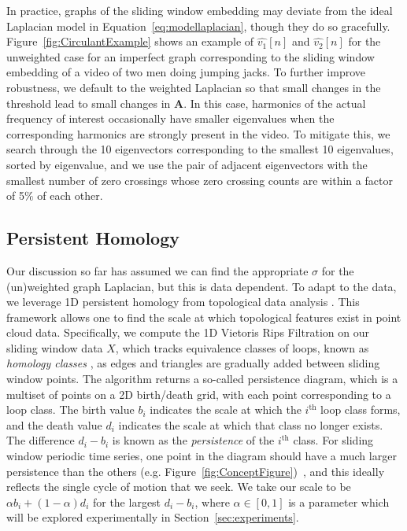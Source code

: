 \documentclass{article}
\newcommand{\mb}{\mathbf}
\begin{document}
In practice, graphs of the sliding window embedding may deviate from the ideal Laplacian model in Equation~\ref{eq:modellaplacian}, though they do so gracefully.  Figure~\ref{fig:CirculantExample} shows an example of $\hat{v_1}[n]$ and $\hat{v_2}[n]$ for the unweighted case for an imperfect graph corresponding to the sliding window embedding of a video of two men doing jumping jacks.  To further improve robustness, we default to the weighted Laplacian so that small changes in the threshold lead to small changes in $\mb{A}$.  In this case, harmonics of the actual frequency of interest occasionally have smaller eigenvalues when the corresponding harmonics are strongly present in the video.  To mitigate this, we search through the 10 eigenvectors corresponding to the smallest 10 eigenvalues, sorted by eigenvalue, and we use the pair of adjacent eigenvectors with the smallest number of zero crossings whose zero crossing counts are within a factor of 5$\%$ of each other.

\subsection{Persistent Homology}
\label{sec:tda}
Our discussion so far has assumed we can find the appropriate $\sigma$ for the (un)weighted graph Laplacian, but this is data dependent.
To adapt to the data, we leverage 1D persistent homology from topological data analysis \cite{edelsbrunner2010computational}.  This framework allows one to find the scale at which topological features exist in point cloud data.  Specifically, we compute the 1D Vietoris Rips Filtration on our sliding window data $X$, which tracks equivalence classes of loops, known as {\em homology classes} \cite{Hatcher}, as edges and triangles are gradually added between sliding window points.  The algorithm returns a so-called persistence diagram, which is a multiset of points on a 2D birth/death grid, with each point corresponding to a loop class.  The birth value $b_i$ indicates the scale at which the $i^{\text{th}}$ loop class forms, and the death value $d_i$ indicates the scale at which that class no longer exists.  The difference $d_i - b_i$ is known as the {\em persistence} of the $i^{\text{th}}$ class.  For sliding window periodic time series, one point in the diagram should have a much larger persistence than the others (e.g. Figure~\ref{fig:ConceptFigure})~\cite{perea2015sliding,tralie2017quasi}, and this ideally reflects the single cycle of motion that we seek.  We take our scale to be $\alpha b_i + (1-\alpha)d_i$ for the largest $d_i - b_i$, where $\alpha \in [0, 1]$ is a parameter which will be explored experimentally in Section~\ref{sec:experiments}.
\end{document}
